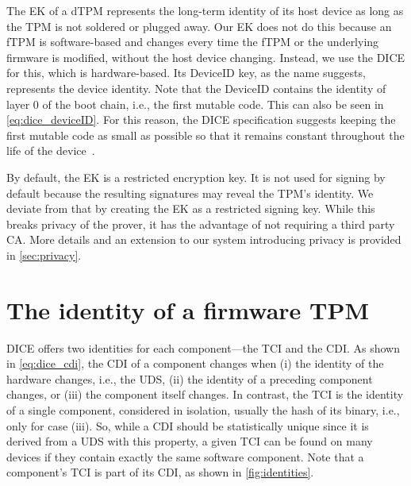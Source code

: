 The \ac{EK} of a \ac{dTPM} represents the long-term identity of its host device as long as the \ac{TPM} is not soldered or plugged away.
Our \ac{EK} does not do this because an \ac{fTPM} is software-based and changes every time the \ac{fTPM} or the underlying firmware is modified, without the host device changing.
Instead, we use the DICE for this, which is hardware-based.
Its DeviceID key, as the name suggests, represents the device identity.
Note that the DeviceID contains the identity of layer 0 of the boot chain, i.e., the first mutable code.
This can also be seen in \autoref{eq:dice_deviceID}.
For this reason, the DICE specification suggests keeping the first mutable code as small as possible so that it remains constant throughout the life of the device~\cite{dice-layering-arch}.


By default, the \ac{EK} is a restricted encryption key.
It is not used for signing by default because the resulting signatures may reveal the TPM's identity.
We deviate from that by creating the \ac{EK} as a restricted signing key.
While this breaks privacy of the prover, it has the advantage of not requiring a third party \ac{CA}\@.
More details and an extension to our system introducing privacy is provided in \autoref{sec:privacy}.

\section{The identity of a firmware TPM}

DICE offers two identities for each component---the TCI and the CDI\@.
As shown in \autoref{eq:dice_cdi}, the CDI of a component changes when (i) the identity of the hardware changes, i.e., the \ac{UDS}, (ii) the identity of a preceding component changes, or (iii) the component itself changes.
In contrast, the TCI is the identity of a single component, considered in isolation, usually the hash of its binary, i.e., only for case (iii).
So, while a CDI should be statistically unique since it is derived from a \ac{UDS} with this property, a given TCI can be found on many devices if they contain exactly the same software component.
Note that a component's TCI is part of its CDI, as shown in \autoref{fig:identities}.



